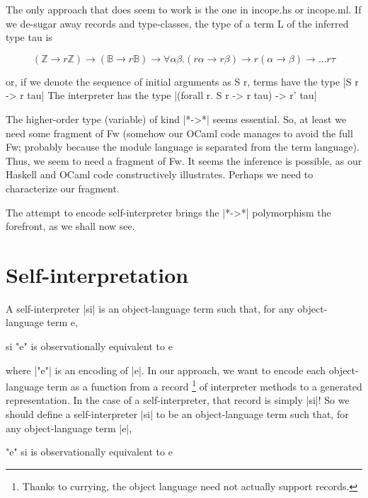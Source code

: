 \documentclass[preprint]{sigplanconf}
\newcommand{\ZZ}{\mathbb{Z}}
\newcommand{\BB}{\mathbb{B}}
\begin{document}
The only approach that does seem to work
is the one in incope.hs or incope.ml. If we de-sugar away records and
type-classes, the type of a term L of the inferred type tau is

$$ 
  (\ZZ \rightarrow r \ZZ) \rightarrow
  (\BB \rightarrow r \BB) \rightarrow
  \forall \alpha \beta. (r \alpha \rightarrow r \beta)
      \rightarrow r (\alpha\rightarrow\beta) \rightarrow ... r \tau
$$

or, if we denote the sequence of initial arguments as S r, terms have
the type |S r -> r tau|
The interpreter has the type
|(forall r. S r -> r tau) -> r' tau|

The higher-order type (variable) of kind |*->*| seems essential. So, at
least we need some fragment of Fw (somehow our OCaml code manages to
avoid the full Fw; probably because the module language is separated
from the term language). Thus, we seem to need a fragment of Fw. It
seems the inference is possible, as our Haskell and OCaml code
constructively illustrates. Perhaps we need to characterize our
fragment.

The attempt to encode self-interpreter brings the |*->*| polymorphism
the forefront, as we shall now see.

\section{Self-interpretation}\label{selfinterp}

A self-interpreter |si| is an
object-language term such that, for any object-language term e,

\begin{code}
  si "e"    is observationally equivalent to    e
\end{code}

where |"e"| is an encoding of |e|.  In our approach, we want to encode
each object-language term as a function from a record%
\footnote{Thanks to currying, the object language need not actually support
records.}  of interpreter methods to a generated representation.  
In the case of a self-interpreter, that
record is simply |si|!  So we should define a self-interpreter |si| to be an
object-language term such that, for any object-language term |e|,

\begin{code}
  "e" si    is observationally equivalent to    e
\end{code}
\end{document}
